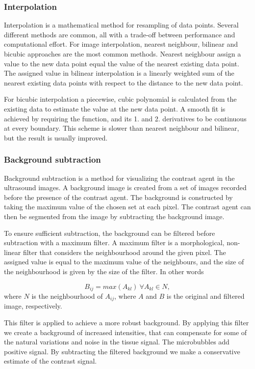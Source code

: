 \subsubsection{Interpolation}
Interpolation is a mathematical method for resampling of data points. Several different methods are common, all with a trade-off between performance and computational effort. For image interpolation, nearest neighbour, bilinear and bicubic approaches are the most common methods. Nearest neighbour assign a value to the new data point equal the value of the nearest existing data point. The assigned value in bilinear interpolation is a linearly weighted sum of the nearest existing data points with respect to the distance to the new data point. 

For bicubic interpolation a piecewise, cubic polynomial is calculated from the existing data to estimate the value at the new data point. A smooth fit is achieved by requiring the function, and its 1. and 2. derivatives to be continuous at every boundary. This scheme is slower than nearest neighbour and bilinear, but the result is usually improved.  

\subsubsection{Background subtraction}
Background subtraction is a method for visualizing the contrast agent in the ultrasound images. A background image is created from a set of images recorded before the presence of the contrast agent. The background is constructed by taking the maximum value of the chosen set at each pixel. The contrast agent can then be segmented from the image by subtracting the background image. 

To ensure sufficient subtraction, the background can be filtered before subtraction with a maximum filter. A maximum filter is a morphological, non-linear filter that considers the neighbourhood around the given pixel. The assigned value is equal to the maximum value of the neighbours, and the size of the neighbourhood is given by the size of the filter. In other words

\begin{equation}
B_{ij} = max(A_{kl})\ \forall A_{kl} \in N,
\end{equation}
where $N$ is the neighbourhood of $A_{ij}$, where $A$ and $B$ is the original and filtered image, respectively. 

This filter is applied to achieve a more robust background. By applying this filter we create a background of increased intensities, that can compensate for some of the natural variations and noise in the tissue signal. The microbubbles add positive signal. By subtracting the filtered background we make a conservative estimate of the contrast signal. 

